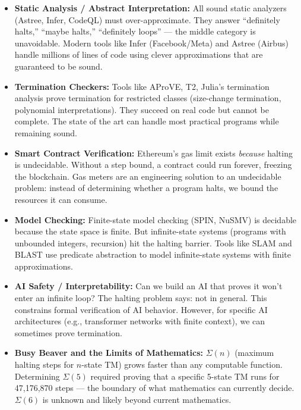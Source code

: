 \begin{itemize}
\item \textbf{Static Analysis / Abstract Interpretation:} All sound static analyzers (Astree, Infer, CodeQL) must over-approximate. They answer ``definitely halts,'' ``maybe halts,'' ``definitely loops'' — the middle category is unavoidable. Modern tools like Infer (Facebook/Meta) and Astree (Airbus) handle millions of lines of code using clever approximations that are guaranteed to be sound.

\item \textbf{Termination Checkers:} Tools like AProVE, T2, Julia's termination analysis prove termination for restricted classes (size-change termination, polynomial interpretations). They succeed on real code but cannot be complete. The state of the art can handle most practical programs while remaining sound.

\item \textbf{Smart Contract Verification:} Ethereum's gas limit exists \emph{because} halting is undecidable. Without a step bound, a contract could run forever, freezing the blockchain. Gas meters are an engineering solution to an undecidable problem: instead of determining whether a program halts, we bound the resources it can consume.

\item \textbf{Model Checking:} Finite-state model checking (SPIN, NuSMV) is decidable because the state space is finite. But infinite-state systems (programs with unbounded integers, recursion) hit the halting barrier. Tools like SLAM and BLAST use predicate abstraction to model infinite-state systems with finite approximations.

\item \textbf{AI Safety / Interpretability:} Can we build an AI that proves it won't enter an infinite loop? The halting problem says: not in general. This constrains formal verification of AI behavior. However, for specific AI architectures (e.g., transformer networks with finite context), we can sometimes prove termination.

\item \textbf{Busy Beaver and the Limits of Mathematics:} $\Sigma(n)$ (maximum halting steps for $n$-state TM) grows faster than any computable function. Determining $\Sigma(5)$ required proving that a specific 5-state TM runs for 47,176,870 steps — the boundary of what mathematics can currently decide. $\Sigma(6)$ is unknown and likely beyond current mathematics.


\end{itemize}
